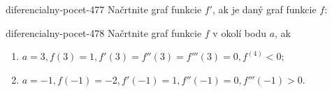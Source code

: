 \begin{defproblem}{diferencialny-pocet-477}
Načrtnite graf funkcie $f'$, ak je daný graf funkcie $f$:

\end{defproblem}

\begin{defproblem}{diferencialny-pocet-478}
Načrtnite graf funkcie $f$ v okolí bodu $a$, ak
\begin{enumerate}
\item $a=3,f(3)=1,f'(3)=f''(3)=f'''(3)=0,f^{(4)}<0$;
\item $a=-1,f(-1)=-2,f'(-1)=1,f''(-1)=0,f'''(-1)>0$.
\end{enumerate}
\end{defproblem}